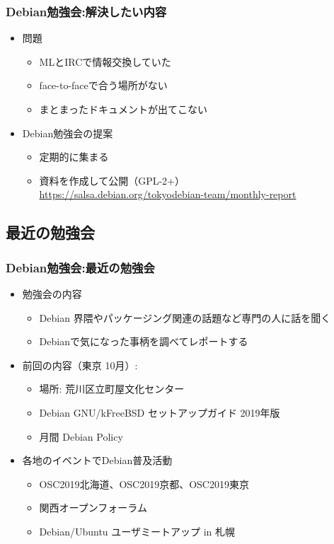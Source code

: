 \begin{frame}

\frametitle{Debian勉強会:解決したい内容}
\begin{itemize}
 \item 問題
   \begin{itemize}
   \item MLとIRCで情報交換していた
   \item face-to-faceで合う場所がない
   \item まとまったドキュメントが出てこない
   \end{itemize}
 \item Debian勉強会の提案
   \begin{itemize}
   \item 定期的に集まる
   \item 資料を作成して公開（GPL-2+） \\
	 {\small \url{https://salsa.debian.org/tokyodebian-team/monthly-report}}
   \end{itemize}
\end{itemize}

\end{frame}


\subsection{最近の勉強会}


\begin{frame}
  
\frametitle{Debian勉強会:最近の勉強会}
  
\begin{itemize}
\item 勉強会の内容
  \begin{itemize}
  \item Debian 界隈やパッケージング関連の話題など専門の人に話を聞く
  \item Debianで気になった事柄を調べてレポートする
  \end{itemize}
\item 前回の内容（東京 10月）:
  \begin{itemize}
  \item 場所: 荒川区立町屋文化センター
  \item Debian GNU/kFreeBSD セットアップガイド 2019年版
  \item 月間 Debian Policy
  \end{itemize}
\item 各地のイベントでDebian普及活動
  \begin{itemize}
  \item OSC2019北海道、OSC2019京都、OSC2019東京
  \item 関西オープンフォーラム
  \item Debian/Ubuntu ユーザミートアップ in 札幌
  \end{itemize}
\end{itemize}

\end{frame}

